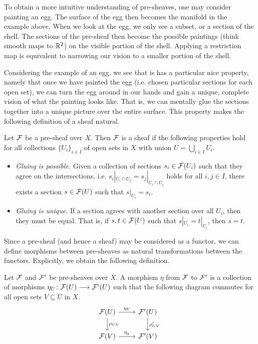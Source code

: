 \documentclass[a4paper]{amsart}
\begin{document}
To obtain a more intuitive understanding of pre-sheaves, one may consider painting an egg. The surface of the egg then becomes the manifold in the example above. When we look at the egg, we only see a subset, or a section of the shell. The sections of the pre-sheaf then become the possible paintings (think smooth maps to $\mathbb{R}^2$) on the visible portion of the shell. Applying a restriction map is equivalent to narrowing our vision to a smaller portion of the shell.

Considering the example of an egg, we see that is has a particular nice property, namely that once we have painted the egg (i.e. chosen particular sections for each open set), we can turn the egg around in our hands and gain a unique, complete vision of what the painting looks like. That is, we can mentally glue the sections together into a unique picture over the entire surface. This property makes the following definition of a sheaf natural.
\begin{Definition}
    Let $\mathcal{F}$ be a pre-sheaf over $X$. Then $\mathcal{F}$ is a sheaf if the following properties hold for all collections $\{U_i\}_{i\in I}$ of open sets in $X$ with union $U = \bigcup_{i\in I} U_i$.
    \begin{itemize}
        \item \emph{Gluing is possible.} Given a collection of sections $s_i \in \mathcal{F}(U_i)$ such that they agree on the intersections, i.e. $s_i|_{U_i \cap U_j} = s_j|_{U_i \cap U_j}$ holds for all $i,j\in I$, there exists a section $s\in \mathcal{F}(U)$ such that $s|_{U_i} = s_i$.
        \item \emph{Gluing is unique.} If a section agrees with another section over all $U_i$, then they must be equal. That is, if $s,t \in \mathcal{F}(U)$ such that $s|_{U_i} = t|_{U_i}$, then $s=t$.
    \end{itemize}
\end{Definition}
Since a pre-sheaf (and hence a sheaf) may be considered as a functor, we can define morphisms between pre-sheaves as natural transformations between the functors. Explicitly, we obtain the following definition.
\begin{Definition}
    Let $\mathcal{F}$ and $\mathcal{F}'$ be pre-sheaves over $X$. A morphism $\eta$ from $\mathcal{F}$ to $\mathcal{F}'$ is a collection of morphisms $\eta_{U}\colon\mathcal{F}(U)\longrightarrow \mathcal{F}'(U)$ such that the following diagram commutes for all open sets $V\subseteq U$ in $X$.
    \[
        \begin{tikzcd}
            \cF(U) \arrow[r, "\eta_U"] \arrow[d, "\rho_{UV}"] & \cF'(U) \arrow[d,"\rho'_{UV}"] \\
            \cF(V) \arrow[r,"\eta_y"]  & \cF'(V)
        \end{tikzcd}
    \]
\end{Definition}
\end{document}
